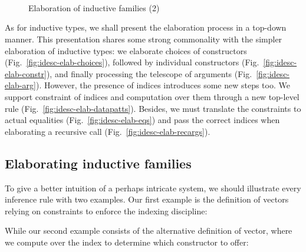 \documentclass{scrartcl}
\theoremstyle{plain}
\theoremstyle{definition}
\begin{document}
\begin{figure}

\centering
{}
\\
\\
\\

\caption{Elaboration of inductive families (2)}
\label{fig:elab-families-2}

\end{figure}



As for inductive types, we shall present the elaboration process in a
top-down manner. This presentation shares some strong commonality with
the simpler elaboration of inductive types: we elaborate choices of
constructors (Fig.~\ref{fig:idesc-elab-choices}), followed by
individual constructors (Fig.~\ref{fig:idesc-elab-constr}), and
finally processing the telescope of arguments
(Fig.~\ref{fig:idesc-elab-arg}). However, the presence of indices
introduces some new steps too. We support constraint of indices and
computation over them through a new top-level rule
(Fig.~\ref{fig:idesc-elab-datapatts}). Besides, we must translate the
constraints to actual equalities (Fig.~\ref{fig:idesc-elab-eqs}) and
pass the correct indices when elaborating a recursive call
(Fig.~\ref{fig:idesc-elab-recargs}).



\subsection{Elaborating inductive families}



To give a better intuition of a perhaps intricate system, we should
illustrate every inference rule with two examples. Our first example
is the definition of vectors relying on constraints to enforce the
indexing discipline:

While our second example consists of the alternative definition of
vector, where we compute over the index to determine which constructor
to offer:


\end{document}
